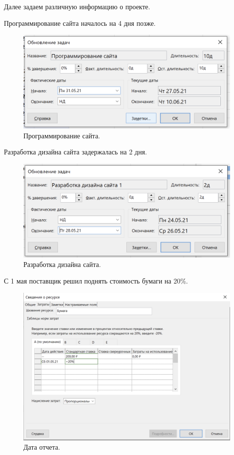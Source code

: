 \documentclass[a4paper,14pt]{extreport} %
\begin{document}
\begin{enumerate}
Далее задаем различную информацию о проекте.

Программирование сайта началось на 4 дня позже.

\begin{figure}[H]
  \centering
  \caption{Программирование сайта. }
  \includegraphics[scale=0.7]{21}
\end{figure}

Разработка дизайна сайта задержалась на 2 дня.

\begin{figure}[H]
  \centering
  \caption{Разработка дизайна сайта. }
  \includegraphics[scale=0.7]{22}
\end{figure}

С 1 мая поставщик решил поднять стоимость бумаги на 20\%.

\begin{figure}[H]
  \centering
  \caption{Дата отчета. }
  \includegraphics[scale=0.7]{23}
\end{figure}


\end{enumerate}
\end{document}
